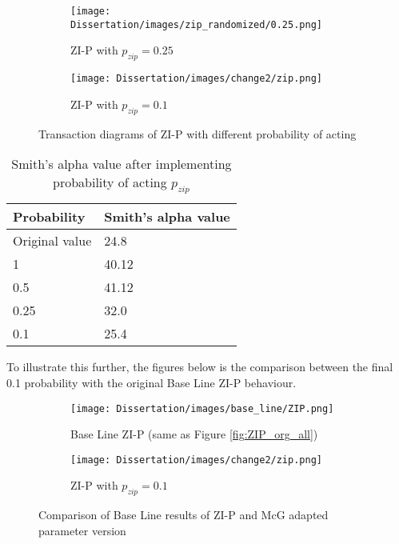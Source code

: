 \begin{figure}[h]
  \begin{subfigure}[b]{0.5\textwidth}
    \texttt{[image: Dissertation/images/zip\_randomized/0.25.png]}
    \caption{ZI-P with $p_{zip} = 0.25$}
    \label{fig:3}
  \end{subfigure}
  \begin{subfigure}[b]{0.5\textwidth}
    \texttt{[image: Dissertation/images/change2/zip.png]}
    \caption{ZI-P with $p_{zip} = 0.1$}
    \label{fig:4}
  \end{subfigure}
\caption{Transaction diagrams of ZI-P with different probability of acting}
\label{fig:ZIP_prob_all}
\end{figure}

\begin{table}[h]
\centering
\begin{tabular}{ |m||p{4cm}|} 
\hline
\textbf{Probability}& \textbf{Smith's alpha value} \\
\hline
\hline
Original value & 24.8\\
\hline 
1 & 40.12 \\ 
\hline
0.5 & 41.12\\ 
\hline
0.25 & 32.0 \\ 
\hline
0.1 & 25.4 \\ 
\hline
\end{tabular}
\caption{Smith's alpha value after implementing probability of acting $p_{zip}$}  
\end{table}
\FloatBarrier
To illustrate this further, the figures below is the comparison between the final 0.1 probability with the original Base Line ZI-P behaviour. 

\begin{figure}[hbpt!]
  \begin{subfigure}[b]{0.5\textwidth}
    \texttt{[image: Dissertation/images/base\_line/ZIP.png]}
    \caption{Base Line ZI-P (same as Figure \ref{fig:ZIP_org_all}) }
    \label{fig:1}
  \end{subfigure}
  \begin{subfigure}[b]{0.5\textwidth}
    \texttt{[image: Dissertation/images/change2/zip.png]}
    \caption{ZI-P with $p_{zip} = 0.1$} 
    \label{fig:2}
  \end{subfigure}
\caption{Comparison of Base Line results of ZI-P and McG adapted parameter version} 
\end{figure}
\FloatBarrier


